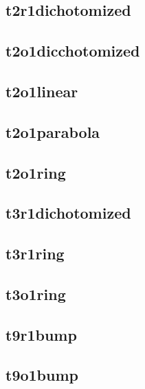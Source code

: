 \documentclass[12pt]{article}
\begin{document}
\subsection{t2r1dichotomized}
\subsection{t2o1dicchotomized}
\subsection{t2o1linear}
\subsection{t2o1parabola}
\subsection{t2o1ring}
\subsection{t3r1dichotomized}
\subsection{t3r1ring}
\subsection{t3o1ring}
\subsection{t9r1bump}
\subsection{t9o1bump}










\newpage
\end{document}
